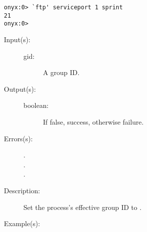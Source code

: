 \begin{description}
\begin{description}
\begin{verbatim}
onyx:0> `ftp' serviceport 1 sprint
21
onyx:0>
		\end{verbatim}
	\end{description}
\label{systemdict:setegid}
\item[{\onyxop{gid}{setegid}{boolean}}: ]
	\begin{description}\item[]
	\item[Input(s): ]
		\begin{description}\item[]
		\item[gid: ]
			A group ID.
		\end{description}
	\item[Output(s): ]
		\begin{description}\item[]
		\item[boolean: ]
			If false, success, otherwise failure.
		\end{description}
	\item[Errors(s): ]
		\begin{description}\item[]
		\item[.]
		\item[.]
		\item[.]
		\end{description}
	\item[Description: ]
		Set the process's effective group ID to .
	\item[Example(s): ]\begin{verbatim}


\end{verbatim}
\end{description}
\end{description}
